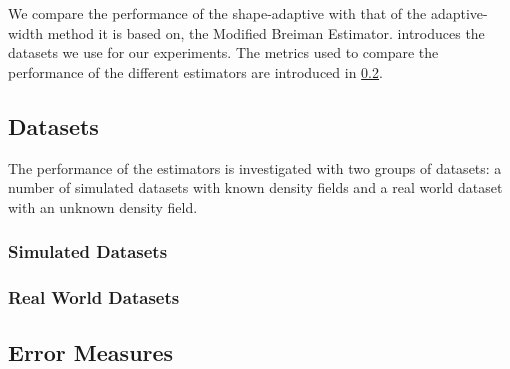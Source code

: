 We compare the performance of the shape-adaptive with that of the adaptive-width method it is based on, \ie the Modified Breiman Estimator.  introduces the datasets we use for our experiments. The metrics used to compare the performance of the different estimators are introduced in \cref{ss:3:errorMeasures}.

\subsection{Datasets}
\label{ss:3:datasets}
	The performance of the estimators is investigated with two groups of datasets: a number of simulated datasets with known density fields and a real world dataset with an unknown density field. 

	\subsubsection*{Simulated Datasets}
					

	\subsubsection*{Real World Datasets}

\subsection{Error Measures}
\label{ss:3:errorMeasures}

